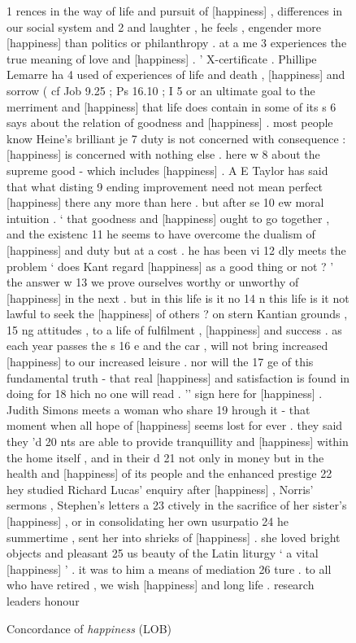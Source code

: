 \begin{figure}
\caption{Concordance of \textit{happiness} (LOB)}
\label{fig:happinesslobconc}
\hrulefill
\begin{fitverb}
 1 rences in the way of life and pursuit of [happiness] , differences in our social system and
 2  and laughter , he feels , engender more [happiness] than politics or philanthropy . at a me
 3 experiences the true meaning of love and [happiness] . ' X-certificate . Phillipe Lemarre ha
 4  used of experiences of life and death , [happiness] and sorrow ( cf Job 9.25 ; Ps 16.10 ; I
 5 or an ultimate goal to the merriment and [happiness] that life does contain in some of its s
 6  says about the relation of goodness and [happiness] . most people know Heine's brilliant je
 7 duty is not concerned with consequence : [happiness] is concerned with nothing else . here w
 8  about the supreme good - which includes [happiness] . A E Taylor has said that what disting
 9 ending improvement need not mean perfect [happiness] there any more than here . but after se
10 ew moral intuition . ` that goodness and [happiness] ought to go together , and the existenc
11 he seems to have overcome the dualism of [happiness] and duty but at a cost . he has been vi
12 dly meets the problem ` does Kant regard [happiness] as a good thing or not ? ' the answer w
13 we prove ourselves worthy or unworthy of [happiness] in the next . but in this life is it no
14 n this life is it not lawful to seek the [happiness] of others ? on stern Kantian grounds ,
15 ng attitudes , to a life of fulfilment , [happiness] and success . as each year passes the s
16 e and the car , will not bring increased [happiness] to our increased leisure . nor will the
17 ge of this fundamental truth - that real [happiness] and satisfaction is found in doing for
18 hich no one will read . '' sign here for [happiness] . Judith Simons meets a woman who share
19 hrough it - that moment when all hope of [happiness] seems lost for ever . they said they 'd
20 nts are able to provide tranquillity and [happiness] within the home itself , and in their d
21  not only in money but in the health and [happiness] of its people and the enhanced prestige
22 hey studied Richard Lucas' enquiry after [happiness] , Norris' sermons , Stephen's letters a
23 ctively in the sacrifice of her sister's [happiness] , or in consolidating her own usurpatio
24 he summertime , sent her into shrieks of [happiness] . she loved bright objects and pleasant
25 us beauty of the Latin liturgy ` a vital [happiness] ' . it was to him a means of mediation
26 ture . to all who have retired , we wish [happiness] and long life . research leaders honour

\end{fitverb}
\end{figure}
